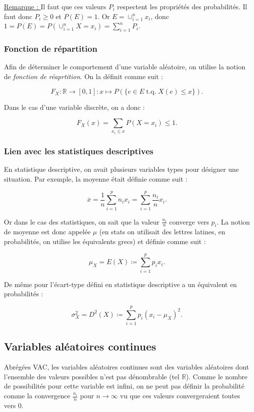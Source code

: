 \documentclass{article}
\DeclareMathOperator{\tq}{\text{ t.q. }}
\begin{document}
		\underline{Remarque : } Il faut que ces valeurs $P_i$ respectent les propriétés des probabilités. Il faut donc $P_i \geq 0$ et $P(E) = 1$. Or $E = \cup_{i=1}^nx_i$,
		donc $1 = P(E) = P(\cup_{i=1}^nX=x_i) = \sum_{i=1}^nP_i$.

		\subsubsection{Fonction de répartition}
			Afin de déterminer le comportement d'une variable aléatoire, on utilise la notion de \textit{fonction de réaprtition}. On la définit comme suit :

			\[F_X : \mathbb R \to [0, 1] : x \mapsto P(\{e \in E \tq X(e) \leq x\}).\]

			Dans le cas d'une variable discrète, on a donc :

			\[F_X(x) = \sum_{x_i \leq x}P(X=x_i) \leq 1.\]

		\subsubsection{Lien avec les statistiques descriptives}
			En statistique descriptive, on avait plusieurs variables types pour désigner une situation. Par exemple, la moyenne était définie comme suit :

			\[\overline x = \frac 1n\sum_{i=1}^pn_ix_i = \sum_{i=1}^p\frac {n_i}nx_i.\]

			Or dans le cas des statistiques, on sait que la valeur $\frac {n_i}n$ converge vers $p_i$. La notion de moyenne est donc appelée $\mu$ (en stats on utilisait des
			lettres latines, en probabilités, on utilise les équivalents grecs) et définie comme suit :

			\[\mu_X = E(X) \coloneqq \sum_{i=1}^pp_ix_i.\]

			De même pour l'écart-type défini en statistique descriptive a un équivalent en probabilités :

			\[\sigma_X^2 = D^2(X) \coloneqq \sum_{i=1}^pp_i(x_i-\mu_X)^2.\]

	\subsection{Variables aléatoires continues}
		Abrégées VAC, les variables aléatoires continues sont des variables aléatoires dont l'ensemble des valeurs possibles n'est pas dénombrable (tel $\mathbb R$).
		Comme le nombre de possibilités pour cette variable est infini, on ne peut pas définir la probabilité comme la convergence $\frac {n_i}n$ pour $n \to \infty$ vu que
		ces valeurs convergeraient toutes vers $0$.
\end{document}
